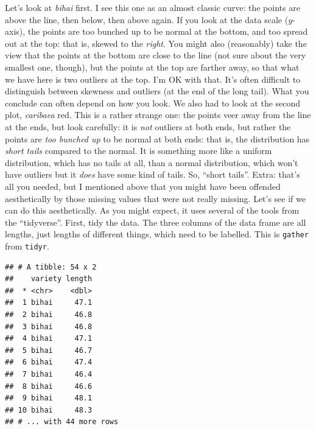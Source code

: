 \documentclass[]{tufte-book}
\newenvironment{Shaded}{}{}
\newcommand{\DataTypeTok}[1]{\textcolor[rgb]{0.56,0.13,0.00}{#1}}
\newcommand{\KeywordTok}[1]{\textcolor[rgb]{0.00,0.44,0.13}{\textbf{#1}}}
\newcommand{\NormalTok}[1]{#1}
\newcommand{\OperatorTok}[1]{\textcolor[rgb]{0.40,0.40,0.40}{#1}}
\newcommand{\StringTok}[1]{\textcolor[rgb]{0.25,0.44,0.63}{#1}}
\theoremstyle{definition}
\theoremstyle{definition}
\theoremstyle{definition}
\theoremstyle{remark}
\begin{document}
Let's look at \emph{bihai} first. I see this one as an almost classic
curve: the points are above the line, then below, then above again. If
you look at the data scale (\(y\)-axis), the points are too bunched up
to be normal at the bottom, and too spread out at the top: that is,
skewed to the \emph{right}. You might also (reasonably) take the view
that the points at the bottom are close to the line (not sure about the
very smallest one, though), but the points at the top are farther away,
so that what we have here is two outliers at the top. I'm OK with that.
It's often difficult to distinguish between skewness and outliers (at
the end of the long tail). What you conclude can often depend on how you
look. We also had to look at the second plot, \emph{caribaea} red. This
is a rather strange one: the points veer away from the line at the ends,
but look carefully: it is \emph{not} outliers at both ends, but rather
the points are \emph{too bunched up} to be normal at both ends: that is,
the distribution has \emph{short tails} compared to the normal. It is
something more like a uniform distribution, which has no tails at all,
than a normal distribution, which won't have outliers but it \emph{does}
have some kind of tails. So, ``short tails''. Extra: that's all you
needed, but I mentioned above that you might have been offended
aesthetically by those missing values that were not really missing.
Let's see if we can do this aesthetically. As you might expect, it uses
several of the tools from the ``tidyverse''. First, tidy the data. The
three columns of the data frame are all lengths, just lengths of
different things, which need to be labelled. This is \texttt{gather}
from \texttt{tidyr}.

\begin{Shaded}
\end{Shaded}

\begin{verbatim}
## # A tibble: 54 x 2
##    variety length
##  * <chr>    <dbl>
##  1 bihai     47.1
##  2 bihai     46.8
##  3 bihai     46.8
##  4 bihai     47.1
##  5 bihai     46.7
##  6 bihai     47.4
##  7 bihai     46.4
##  8 bihai     46.6
##  9 bihai     48.1
## 10 bihai     48.3
## # ... with 44 more rows
\end{verbatim}
\end{document}
